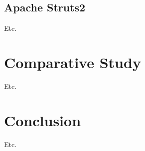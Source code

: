 \documentclass[]{scrartcl}
\begin{document}
		\subsection{Apache Struts2} {
			Etc.
		}	
		\clearpage
	
	\clearpage
	
	\section{Comparative Study} {
		Etc.
	}
	\clearpage
	
	\section{Conclusion} {
		Etc.
	}
	\clearpage
	
	 {
		
	}
\end{document}
